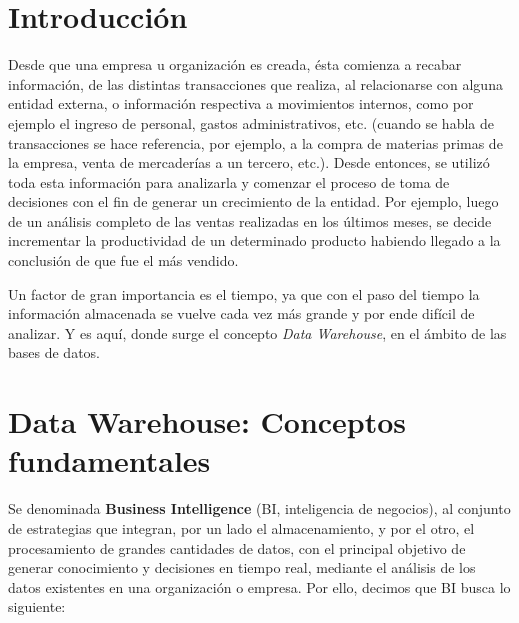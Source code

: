 \documentclass[a4paper,11pt]{article}
\begin{document}
  \newpage\null\thispagestyle{empty}\newpage
  
  \maketitle
  \tableofcontents

    
  
    \section{Introducción} %

    Desde que una empresa u organización es creada, ésta comienza a recabar información, de las distintas transacciones que realiza, al relacionarse
    con alguna entidad externa, o información respectiva a movimientos internos, como por ejemplo el ingreso de personal, gastos administrativos,
    etc. (cuando se habla de transacciones se hace referencia, por ejemplo, a la compra de materias primas de la empresa, venta de mercaderías a un tercero,
    etc.). Desde entonces, se utilizó toda esta información para analizarla y comenzar el proceso de toma de decisiones con el fin de generar un
    crecimiento de la entidad. Por ejemplo, luego de un análisis completo de las ventas realizadas en los últimos meses, se decide incrementar la 
    productividad de un determinado producto habiendo llegado a la conclusión de que fue el más vendido.
    
    Un factor de gran importancia es el tiempo, ya que con el paso del tiempo la información almacenada se vuelve cada vez más grande 
    y por ende difícil de analizar. Y es aquí, donde surge el concepto \textit{Data Warehouse}, en el ámbito de las bases de datos.

    \section{Data Warehouse: Conceptos fundamentales}
    
    Se denominada \textbf{Business Intelligence} (BI, inteligencia de negocios), al conjunto de estrategias que integran, por un lado el almacenamiento, y
    por el otro, el procesamiento de grandes cantidades de datos, con el principal objetivo de generar conocimiento y decisiones en tiempo real, mediante 
    el análisis de los datos existentes en una organización o empresa. Por ello, decimos que BI busca lo siguiente:
    
\end{document}
